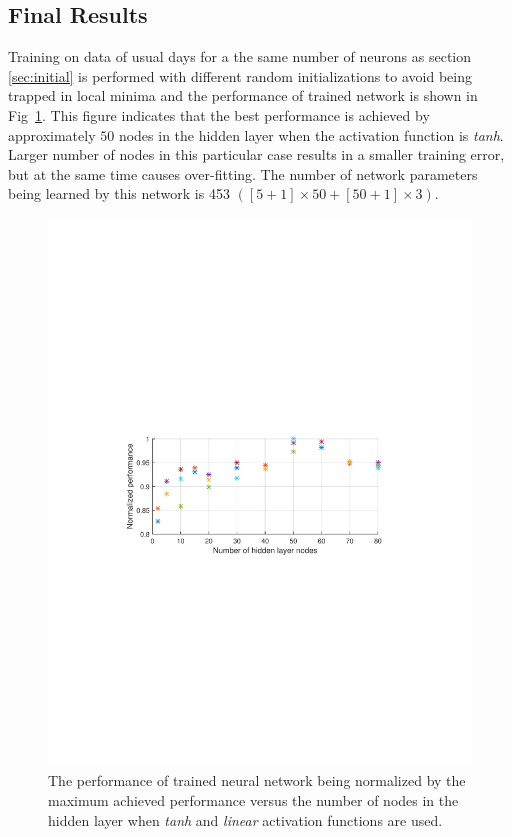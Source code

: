 \documentclass[twocolumn,10pt]{asme2e}
\begin{document}
\subsection{Final Results}
Training on data of usual days for a the same number of neurons as section \ref{sec:initial} is performed with different random initializations to avoid being trapped in local minima and the performance of trained network is shown in Fig~\ref{fig:perf1}. This figure indicates that the best performance is achieved by approximately $50$ nodes in the hidden layer when the activation function is \textit{tanh}. Larger number of nodes  in this particular case results in a smaller training error, but at the same time causes over-fitting. The number of network parameters being learned by this network is 453 $\left([5+1]\times50+[50+1]\times 3\right)$.
\begin{figure}[t]
	\centering
	\includegraphics[width=1\linewidth]{./Figures/perf1}
	\caption{ The performance of trained neural network being normalized by the maximum achieved performance versus the number of nodes in the hidden layer when \emph{tanh} and \emph{linear} activation functions are used. }
	\label{fig:perf1}
\end{figure} 
\end{document}
